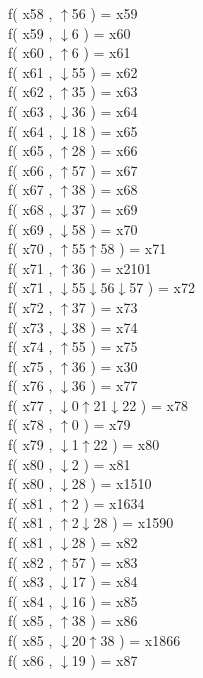 f( x58 , $\uparrow$56 ) = x59 \\
f( x59 , $\downarrow$6 ) = x60 \\
f( x60 , $\uparrow$6 ) = x61 \\
f( x61 , $\downarrow$55 ) = x62 \\
f( x62 , $\uparrow$35 ) = x63 \\
f( x63 , $\downarrow$36 ) = x64 \\
f( x64 , $\downarrow$18 ) = x65 \\
f( x65 , $\uparrow$28 ) = x66 \\
f( x66 , $\uparrow$57 ) = x67 \\
f( x67 , $\uparrow$38 ) = x68 \\
f( x68 , $\downarrow$37 ) = x69 \\
f( x69 , $\downarrow$58 ) = x70 \\
f( x70 , $\uparrow$55$\uparrow$58 ) = x71 \\
f( x71 , $\uparrow$36 ) = x2101 \\
f( x71 , $\downarrow$55$\downarrow$56$\downarrow$57 ) = x72 \\
f( x72 , $\uparrow$37 ) = x73 \\
f( x73 , $\downarrow$38 ) = x74 \\
f( x74 , $\uparrow$55 ) = x75 \\
f( x75 , $\uparrow$36 ) = x30 \\
f( x76 , $\downarrow$36 ) = x77 \\
f( x77 , $\downarrow$0$\uparrow$21$\downarrow$22 ) = x78 \\
f( x78 , $\uparrow$0 ) = x79 \\
f( x79 , $\downarrow$1$\uparrow$22 ) = x80 \\
f( x80 , $\downarrow$2 ) = x81 \\
f( x80 , $\downarrow$28 ) = x1510 \\
f( x81 , $\uparrow$2 ) = x1634 \\
f( x81 , $\uparrow$2$\downarrow$28 ) = x1590 \\
f( x81 , $\downarrow$28 ) = x82 \\
f( x82 , $\uparrow$57 ) = x83 \\
f( x83 , $\downarrow$17 ) = x84 \\
f( x84 , $\downarrow$16 ) = x85 \\
f( x85 , $\uparrow$38 ) = x86 \\
f( x85 , $\downarrow$20$\uparrow$38 ) = x1866 \\
f( x86 , $\downarrow$19 ) = x87 \\
